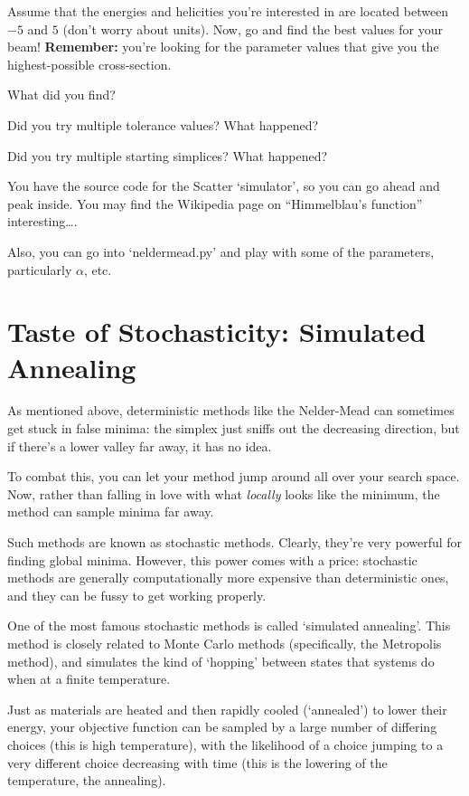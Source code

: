 \documentclass{article}
\begin{document}
    Assume that the energies and 
    helicities you're interested in are located between
    $-5$ and $5$ (don't worry about units). Now, go and
		find the best values for your beam! \textbf{Remember:}
		you're looking for the parameter values that give you
		the highest-possible cross-section.

    What did you find? 
    
    Did you try multiple tolerance values? What happened?
    
    Did you try multiple starting simplices?
    What happened? 

    You have the source code for the Scatter `simulator', so you
    can go ahead and peak inside. 
    You may find the Wikipedia page on ``Himmelblau's function'' interesting\dots.

    Also, you can go into `neldermead.py' and play with some of the 
    parameters, particularly $\alpha$, etc.

\section*{Taste of Stochasticity: Simulated Annealing}
  As mentioned above, deterministic methods like
  the Nelder-Mead can sometimes get stuck in false minima:
  the simplex just sniffs out the decreasing direction,
  but if there's a lower valley far away, it has no idea.

  To combat this, you can let your method jump around all over your search space.
  Now, rather than falling in love with what \emph{locally} looks like the 
  minimum, the method can sample minima far away.

  Such methods are known as stochastic methods. Clearly, they're very powerful
  for finding global minima. However, this power comes with a price:
  stochastic methods are generally computationally more expensive than
  deterministic ones, and they can be fussy to get working properly.

  One of the most famous stochastic methods is called 
  `simulated annealing'.
  This method is closely related to Monte Carlo methods 
  (specifically, the Metropolis method), and simulates the kind
  of `hopping' between states that systems do when at a finite 
  temperature.
  
  Just as materials are heated and then rapidly cooled
  (`annealed') to lower their energy, 
  your objective function can be sampled by a large number of differing choices
  (this is high temperature), with the likelihood of a choice 
  jumping to a very different choice decreasing with time
  (this is the lowering of the temperature, the annealing).
\end{document}
